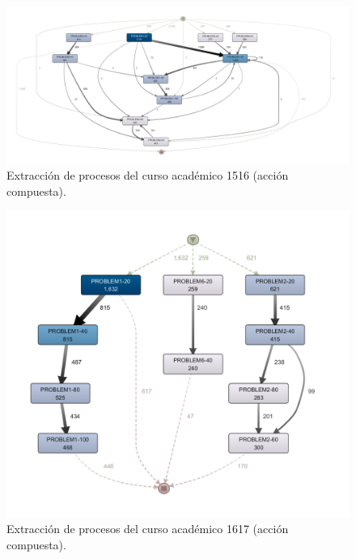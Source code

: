 \begin{figure}[H]
    \centering
    \includegraphics[width=1.25\textwidth]{imagenes/DISCO_compound/Year1516.png}
    \caption{Extracción de procesos del curso académico 1516 (acción compuesta).}
    \label{fig:año1516}
\end{figure}

\begin{figure}[H]
    \centering
    \includegraphics[width=1.25\textwidth]{imagenes/DISCO_compound/Year1617.png}
    \caption{Extracción de procesos del curso académico 1617 (acción compuesta).}
    \label{fig:año1617}
\end{figure}

